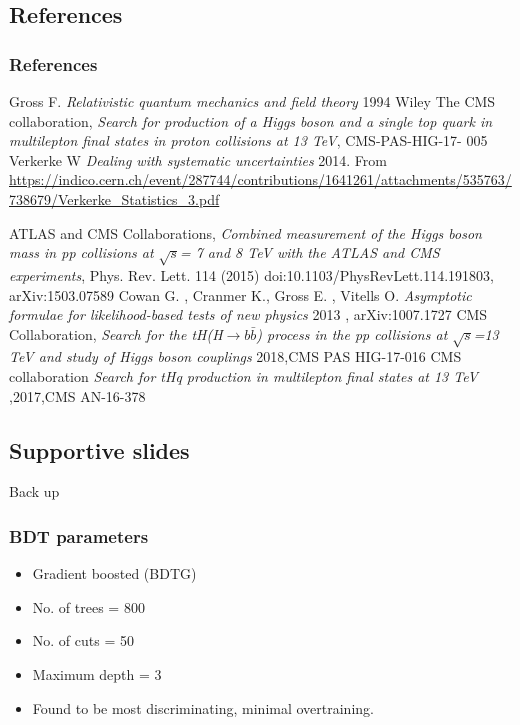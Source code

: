 \documentclass[11pt]{beamer}
\begin{document}
	\begin{thebibliography}{99}
	\begin{frame}
	\section{References}
	\frametitle{References}

	
	Gross F. \textit{Relativistic quantum mechanics and field theory} 1994 Wiley
		The CMS collaboration, \textit{Search for production of a Higgs boson and a single top
	quark in multilepton final states in proton collisions at 13 TeV}, CMS-PAS-HIG-17-
	005
	Verkerke W \textit{Dealing with systematic uncertainties} 2014. From
\url{https://indico.cern.ch/event/287744/contributions/1641261/attachments/535763/738679/Verkerke_Statistics_3.pdf}
\end{frame}

\begin{frame}
 ATLAS and CMS
Collaborations, \textit{Combined measurement of the Higgs boson mass in
	pp collisions at $\sqrt{s}$= 7 and 8 TeV with the ATLAS and CMS experiments}, Phys. Rev. Lett.
114 (2015) doi:10.1103/PhysRevLett.114.191803, arXiv:1503.07589
 Cowan G. , Cranmer K., Gross E. , Vitells O.\textit{ Asymptotic formulae for
	likelihood-based tests of new physics} 2013 , arXiv:1007.1727
 CMS Collaboration, \textit{Search for the tH(H$\rightarrow b \bar{b}$) process in the pp collisions at $
	\sqrt{s}$=13 TeV and study of Higgs boson couplings} 2018,CMS PAS HIG-17-016
CMS collaboration \textit{Search for tHq production in multilepton final states at 13 TeV} ,2017,CMS AN-16-378

\end{frame}
\end{thebibliography}

\begin{frame}
\section{Supportive slides}
\huge{Back up}
\end{frame}

\begin{frame}
\frametitle{BDT parameters}

\begin{itemize}
\item Gradient boosted (BDTG)
\item No. of trees = 800
\item No. of cuts = 50
\item Maximum depth = 3
\item Found to be most discriminating, minimal overtraining.
\end{itemize}
\end{frame}
\end{document}
